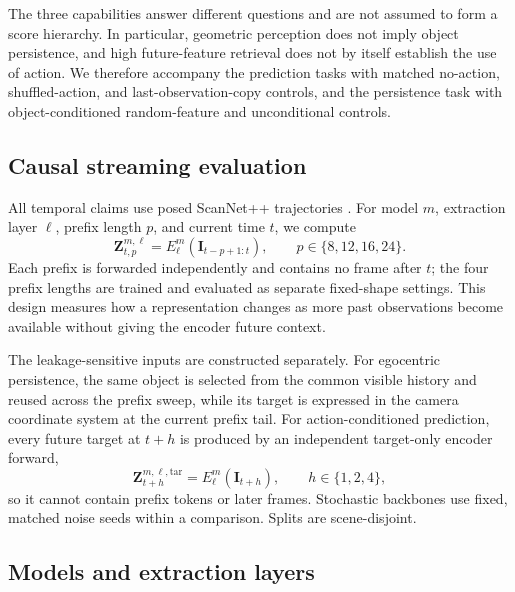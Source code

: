The three capabilities answer different questions and are not assumed to form
a score hierarchy. In particular, geometric perception does not imply object
persistence, and high future-feature retrieval does not by itself establish
the use of action. We therefore accompany the prediction tasks with matched
no-action, shuffled-action, and last-observation-copy controls, and the
persistence task with object-conditioned random-feature and unconditional
controls.

\subsection{Causal streaming evaluation}
\label{sec:streaming-evaluation}

All temporal claims use posed ScanNet++ trajectories
\citep{yeshwanth2023scannetpp}. For model $m$, extraction layer $\ell$, prefix
length $p$, and current time $t$, we compute
\begin{equation}
  \mathbf{Z}^{m,\ell}_{t,p}
  = E^{m}_{\ell}\!\left(\mathbf{I}_{t-p+1:t}\right),
  \qquad p\in\{8,12,16,24\}.
  \label{eq:causal-streaming-feature}
\end{equation}
Each prefix is forwarded independently and contains no frame after $t$; the
four prefix lengths are trained and evaluated as separate fixed-shape
settings. This design measures how a representation changes as more past
observations become available without giving the encoder future context.

The leakage-sensitive inputs are constructed separately. For egocentric
persistence, the same object is selected from the common visible history and
reused across the prefix sweep, while its target is expressed in the camera
coordinate system at the current prefix tail. For action-conditioned
prediction, every future target at $t+h$ is produced by an independent
target-only encoder forward,
\begin{equation}
  \mathbf{Z}^{m,\ell,\mathrm{tar}}_{t+h}
  = E^{m}_{\ell}\!\left(\mathbf{I}_{t+h}\right),
  \qquad h\in\{1,2,4\},
  \label{eq:isolated-target-feature}
\end{equation}
so it cannot contain prefix tokens or later frames. Stochastic backbones use
fixed, matched noise seeds within a comparison. Splits are scene-disjoint.

\subsection{Models and extraction layers}
\label{sec:model-layer-grid}

